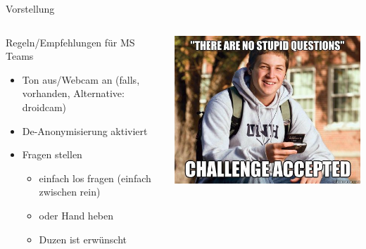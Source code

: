 \documentclass[aspectratio=169]{beamer}
\begin{document}
\begin{frame}[fragile]{Vorstellung}
 \begin{columns}[T,onlytextwidth]
      \begin{block}{Regeln/Empfehlungen für MS Teams}
        \begin{itemize}
          \item Ton aus/Webcam an (falls, vorhanden, Alternative: droidcam)
          \item De-Anonymisierung aktiviert
          \item Fragen stellen \begin{itemize}
            \item einfach los fragen (einfach zwischen rein)
            \item oder Hand heben
            \item Duzen ist erwünscht
          \end{itemize}
        \end{itemize}
      \end{block}
      \includegraphics[scale=0.4]{../images/questions-meme.jpg}
  \end{columns}

\end{frame}
\end{document}
